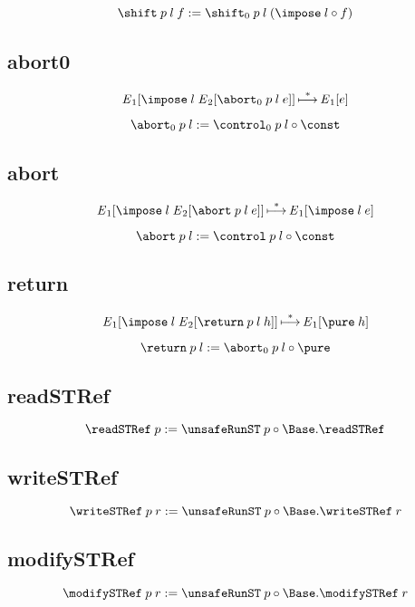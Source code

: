 \documentclass{report}
\begin{document}
\[
  \shift \app p \app l \app f
    := \shift_0 \app p \app l \app \br{\impose \app l \comp f}
\]

\subsection{abort0}

\[
  {\E}_1 \sq{\impose \app l \app {\E}_2 \sq{\abort_0 \app p \app l \app e}}
    \step^*
  {\E}_1 \sq e
\]

\[
  \abort_0 \app p \app l := \control_0 \app p \app l \comp \const
\]

\subsection{abort}

\[
  {\E}_1 \sq{\impose \app l \app {\E}_2 \sq{\abort \app p \app l \app e}}
    \step^*
  {\E}_1 \sq{\impose \app l \app e}
\]

\[
  \abort \app p \app l := \control \app p \app l \comp \const
\]

\subsection{return}

\[
  {\E}_1 \sq{\impose \app l \app {\E}_2 \sq{\return \app p \app l \app h}}
    \step^*
  {\E}_1 \sq{\pure \app h}
\]

\[
  \return \app p \app l := \abort_0 \app p \app l \comp \pure
\]

\subsection{readSTRef}

\[
  \readSTRef \app p := \unsafeRunST \app p \comp \Base\qual\readSTRef
\]

\subsection{writeSTRef}

\[
  \writeSTRef \app p \app r
    := \unsafeRunST \app p \comp \Base\qual\writeSTRef \app r
\]

\subsection{modifySTRef}

\[
  \modifySTRef \app p \app r
    := \unsafeRunST \app p \comp \Base\qual\modifySTRef \app r
\]
\end{document}

